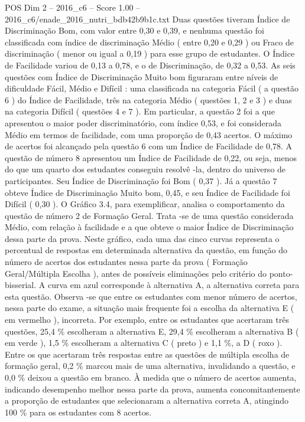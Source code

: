 \begin{textsample}{POS Dim 2 – 2016\_c6 – Score 1.00 – 2016\_c6/enade\_2016\_nutri\_bdb42b9b1c.txt}
Duas questões tiveram Índice de Discriminação Bom, com valor entre 0,30 e 0,39, e nenhuma questão foi classificada com índice de discriminação Médio ( entre 0,20 e 0,29 ) ou Fraco de discriminação ( menor ou igual a 0,19 ) para esse grupo de estudantes.
O Índice de Facilidade variou de 0,13 a 0,78, e o de Discriminação, de 0,32 a 0,53.
As seis questões com Índice de Discriminação Muito bom figuraram entre níveis de dificuldade Fácil, Médio e Difícil : uma classificada na categoria Fácil ( a questão 6 ) do Índice de Facilidade, três na categoria Médio ( questões 1, 2 e 3 ) e duas na categoria Difícil ( questões 4 e 7 ).
Em particular, a questão 2 foi a que apresentou o maior poder discriminatório, com índice 0,53, e foi considerada Médio em termos de facilidade, com uma proporção de 0,43 acertos.
O máximo de acertos foi alcançado pela questão 6 com um Índice de Facilidade de 0,78.
A questão de número 8 apresentou um Índice de Facilidade de 0,22, ou seja, menos do que um quarto dos estudantes conseguiu resolvê -la, dentro do universo de participantes.
Seu Índice de Discriminação foi Bom ( 0,37 ).
Já a questão 7 obteve Índice de Discriminação Muito bom, 0,45, e seu Índice de Facilidade foi Difícil ( 0,30 ).
O Gráfico 3.4, para exemplificar, analisa o comportamento da questão de número 2 de Formação Geral.
Trata -se de uma questão considerada Médio, com relação à facilidade e a que obteve o maior Índice de Discriminação dessa parte da prova.
Neste gráfico, cada uma das cinco curvas representa o percentual de respostas em determinada alternativa da questão, em função do número de acertos dos estudantes nessa parte da prova ( Formação Geral/Múltipla Escolha ), antes de possíveis eliminações pelo critério do ponto-bisserial.
A curva em azul corresponde à alternativa A, a alternativa correta para esta questão.
Observa -se que entre os estudantes com menor número de acertos, nessa parte do exame, a situação mais frequente foi a escolha da alternativa E ( em vermelho ), incorreta.
Por exemplo, entre os estudantes que acertaram três questões, 25,4 \% escolheram a alternativa E, 29,4 \% escolheram a alternativa B ( em verde ), 1,5 \% escolheram a alternativa C ( preto ) e 1,1 \%, a D ( roxo ).
Entre os que acertaram três respostas entre as questões de múltipla escolha de formação geral, 0,2 \% marcou mais de uma alternativa, invalidando a questão, e 0,0 \% deixou a questão em branco.
À medida que o número de acertos aumenta, indicando desempenho melhor nessa parte da prova, aumenta concomitantemente a proporção de estudantes que selecionaram a alternativa correta A, atingindo 100 \% para os estudantes com 8 acertos.

\end{textsample}
